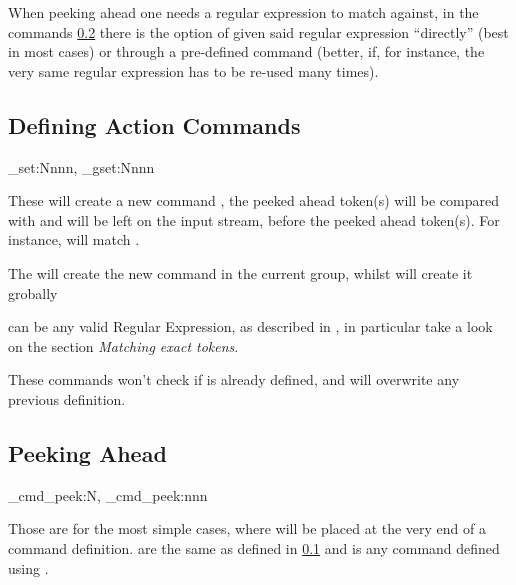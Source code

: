 \documentclass[10pt]{article}
\begin{document}
When peeking ahead one needs a regular expression to match against, in the commands \ref{peek-expl3}  there is the option of given said regular expression ``directly'' (best in most cases) or through a pre-defined command (better, if, for instance, the very same regular expression has to be re-used many times).

\subsection{Defining Action Commands}\label{cmd-def-expl3}
 
\begin{codedescribe}{\xpeekahead_set:Nnnn, \xpeekahead_gset:Nnnn}
\begin{codesyntax}%
\end{codesyntax}
These will create a new command , the peeked ahead token(s) will be compared with  and  will be left on the input stream, before the peeked ahead token(s). For instance,  will match \tsobj[verb]{\begin{envx}}.

The  will create the new command in the current group, whilst   will create it grobally
\end{codedescribe}
\begin{tsremark}
   can be any valid Regular Expression, as described in \cite{expl3}, in particular take a look on the section \emph{Matching exact tokens}.
\end{tsremark}
\begin{tsremark}
  These commands won't check if  is already defined, and will overwrite any previous definition.
\end{tsremark}


\subsection{Peeking Ahead}\label{peek-expl3}

\begin{codedescribe}{\xpeekahead_cmd_peek:N, \xpeekahead_cmd_peek:nnn}
\begin{codesyntax}%
\end{codesyntax}
Those are for the most simple cases, where  will be placed at the very end of a command definition.  are the same as defined in \ref{cmd-def-expl3} and  is any command defined using .
\end{codedescribe}
\end{document}
